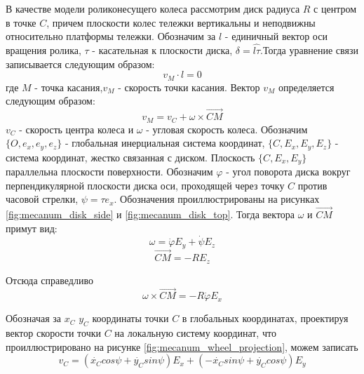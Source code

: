 \documentclass[oneside,final,14pt]{extreport}
\begin{document}
\begin{figure}[H]
\end{figure}

 В качестве модели роликонесущего колеса рассмотрим диск радиуса $R$ с центром в точке $C$, причем плоскости колес тележки вертикальны и неподвижны относительно платформы тележки. Обозначим за $l$ - единичный вектор оси вращения ролика, $\tau$ - касательная к плоскости диска, $\delta = \widehat{l \tau}$.Тогда уравнение связи записывается следующим образом:
\begin{equation}
v_{M}
\cdot
l
=
0
\end{equation}
где $M$ - точка касания,$v_{M}$ - скорость точки касания. Вектор $v_{M}$ определяется следующим образом:
\begin{equation}
v_{M}
=
v_{C}
+
\omega
\times
\overrightarrow{CM}
\end{equation}
 $v_{C}$ -   
скорость центра колеса и  $\omega$ - угловая скорость колеса.
Обозначим $\{O,e_{x},e_{y},e_{z}\}$ - глобальная инерциальная система координат, $\{C,E_{x},E_{y},E_{z}\}$ - система координат, жестко связанная с диском. Плоскость $\{C,E_{x},E_{y}\}$ параллельна плоскости поверхности. Обозначим $\varphi$ - угол поворота диска вокруг перпендикулярной плоскости диска оси, проходящей через точку $C$ против часовой стрелки, $\psi = \widehat{\tau e_{x}}$. Обозначения проиллюстрированы на рисунках \ref{fig:mecanum_disk_side} и \ref{fig:mecanum_disk_top}. Тогда вектора $\omega$ и $\overrightarrow{CM}$ примут вид:
\begin{equation}
\omega
=
\dot{\varphi}
E_{y}
+
\dot{\psi}
E_{z}
\end{equation}
\begin{equation}
\overrightarrow{CM}
=
-R
E_{z}
\end{equation}

Отсюда справедливо
\begin{equation}
\omega
\times
\overrightarrow{CM}
=
-R\dot{\varphi}
E_{x}
\end{equation} 

Обозначая за $x_{C}$ $y_{C}$ координаты точки $C$ в глобальных координатах, проектируя вектор скорости точки $C$ на локальную систему координат, что проиллюстрировано на рисунке \ref{fig:mecanum_wheel_projection}, можем записать
\begin{equation}
\label{eq:velocity_c_projection}
v_{C}
=
(
\dot{x_{C}}
cos\psi
+
\dot{y_{C}}
sin\psi
)
E_{x}
+
(
-\dot{x_{C}}
sin\psi
+
\dot{y_{C}}
cos\psi
)
E_{y}
\end{equation}
\end{document}
